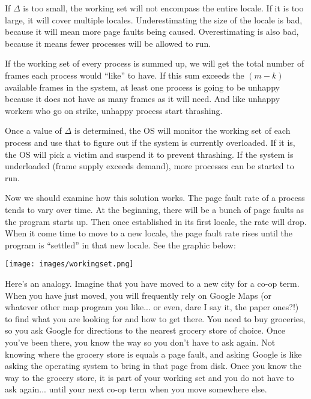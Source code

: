 If $\Delta$ is too small, the working set will not encompass the entire locale. If it is too large, it will cover multiple locales. Underestimating the size of the locale is bad, because it will mean more page faults being caused. Overestimating is also bad, because it means fewer processes will be allowed to run.

If the working set of every process is summed up, we will get the total number of frames each process would ``like'' to have. If this sum exceeds the $(m-k)$ available frames in the system, at least one process is going to be unhappy because it does not have as many frames as it will need. And like unhappy workers who go on strike, unhappy process start thrashing.

Once a value of $\Delta$ is determined, the OS will monitor the working set of each process and use that to figure out if the system is currently overloaded. If it is, the OS will pick a victim and suspend it to prevent thrashing. If the system is underloaded (frame supply exceeds demand), more processes can be started to run.

Now we should examine how this solution works. The page fault rate of a process tends to vary over time. At the beginning, there will be a bunch of page faults as the program starts up. Then once established in its first locale, the rate will drop. When it come time to move to a new locale, the page fault rate rises until the program is ``settled'' in that new locale. See the graphic below:

\begin{center}
	\texttt{[image: images/workingset.png]}
\end{center}

Here's an analogy. Imagine that you have moved to a new city for a co-op term. When you have just moved, you will frequently rely on Google Maps (or whatever other map program you like... or even, dare I say it, the paper ones?!) to find what you are looking for and how to get there. You need to buy groceries, so you ask Google for directions to the nearest grocery store of choice. Once you've been there, you know the way so you don't have to ask again. Not knowing where the grocery store is equals a page fault, and asking Google is like asking the operating system to bring in that page from disk. Once you know the way to the grocery store, it is part of your working set and you do not have to ask again... until your next co-op term when you move somewhere else.



